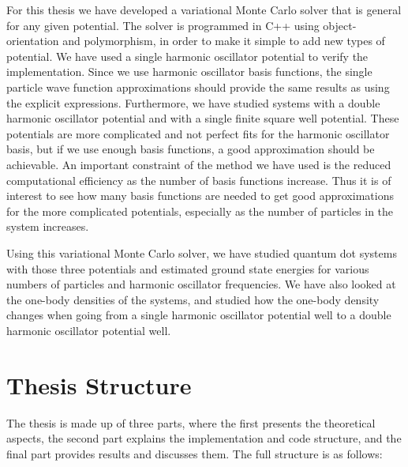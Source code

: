 \documentclass[../main.tex]{subfiles}
\begin{document}
For this thesis we have developed a variational Monte Carlo solver that is general for any given potential. The solver is programmed in C++ using object-orientation and polymorphism, in order to make it simple to add new types of potential. We have used a single harmonic oscillator potential to verify the implementation. Since we use harmonic oscillator basis functions, the single particle wave function approximations should provide the same results as using the explicit expressions. Furthermore, we have studied systems with a double harmonic oscillator potential and with a single finite square well potential. These potentials are more complicated and not perfect fits for the harmonic oscillator basis, but if we use enough basis functions, a good approximation should be achievable. An important constraint of the method we have used is the reduced computational efficiency as the number of basis functions increase. Thus it is of interest to see how many basis functions are needed to get good approximations for the more complicated potentials, especially as the number of particles in the system increases.

Using this variational Monte Carlo solver, we have studied quantum dot systems with those three potentials and estimated ground state energies for various numbers of particles and harmonic oscillator frequencies. We have also looked at the one-body densities of the systems, and studied how the one-body density changes when going from a single harmonic oscillator potential well to a double harmonic oscillator potential well.

\section*{Thesis Structure}
The thesis is made up of three parts, where the first presents the theoretical aspects, the second part explains the implementation and code structure, and the final part provides results and discusses them. The full structure is as follows:
\end{document}
